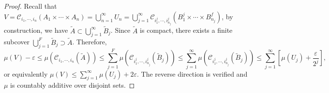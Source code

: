 \documentclass[11pt,english]{smfart}
\newcommand{\mc}{\mathcal}
\begin{document}
\begin{proof}
    Recall that $V = \mc{C}_{i_1,\cdots,i_n} (A_1\times \cdots \times A_n) = \bigcup_{n=1}^\infty U_n = \bigcup_{j=1}^\infty \mc{C}_{i^j_1,\cdots,i^j_{n_j}}(B^j_1\times \cdots \times B^f_{n_j})$, by construction, we have $\tilde{A} \subset \bigcup_{j=1}^\infty \tilde{B}_j$. Since $\tilde{A}$ is compact, there exists a finite subcover $\bigcup_{j=1}^F \tilde{B}_j \supset \tilde{A}$. Therefore, $$\mu(V) - \varepsilon \leq \mu(\mc{C}_{i_1,\cdots,i_n}(\tilde{A})) \leq \sum_{j=1}^F \mu (\mc{C}_{i^j_1,\cdots,i^j_{n_j}}(\tilde{B}_j)) \leq \sum_{j=1}^\infty \mu (\mc{C}_{i^j_1,\cdots,i^j_{n_j}}(\tilde{B}_j)) \leq \sum_{j=1}^\infty \left[\mu(U_j) + \frac{\varepsilon}{2^j}\right],$$ or equivalently $\mu(V)  \leq \sum_{j=1}^\infty \mu(U_j) + 2\varepsilon$. The reverse direction is verified and $\mu$ is countably additive over disjoint sets. 
\end{proof}
\end{document}
